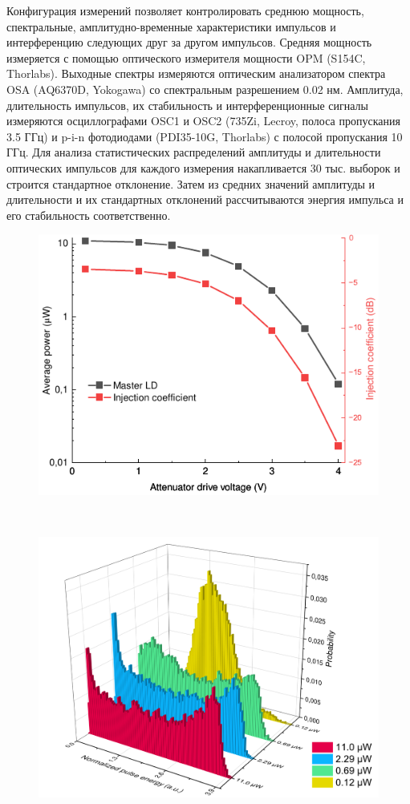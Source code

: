 Конфигурация измерений позволяет контролировать среднюю мощность, спектральные, амплитудно-временные характеристики импульсов и интерференцию следующих друг за другом импульсов. Средняя мощность измеряется с помощью оптического измерителя мощности OPM (S154C, Thorlabs). Выходные спектры измеряются оптическим анализатором спектра OSA (AQ6370D, Yokogawa) со спектральным разрешением 0.02 нм. Амплитуда, длительность импульсов, их стабильность и интерференционные сигналы измеряются осциллографами OSC1 и OSC2 (735Zi, Lecroy, полоса пропускания 3.5 ГГц) и p-i-n фотодиодами (PDI35-10G, Thorlabs) с полосой пропускания 10 ГГц. Для анализа статистических распределений амплитуды и длительности оптических импульсов для каждого измерения накапливается 30 тыс. выборок и строится стандартное отклонение. Затем из средних значений амплитуды и длительности и их стандартных отклонений рассчитываются энергия импульса и его стабильность соответственно.
\begin{figure}
	\centering
	\includegraphics[width=\textwidth]{images/master_power.pdf}
	\caption{}
\end{figure}
\
\begin{figure}
	\centering
	\includegraphics[width=\textwidth]{images/hist_initial.pdf}
	\caption{}
\end{figure}

